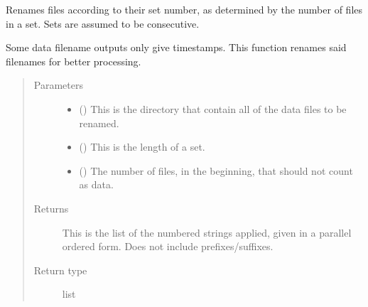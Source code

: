 \documentclass[letterpaper,10pt,english]{sphinxmanual}
\begin{document}

\begin{fulllineitems}
\label{\detokenize{python_docstrings/IfA_Smeargle.bravo.renaming:IfA_Smeargle.bravo.renaming.set_determinization_renaming}}
Renames files according to their set number, as determined by the
number of files in a set. Sets are assumed to be consecutive.

Some data filename outputs only give timestamps. This function renames
said filenames for better processing.
\begin{quote}\begin{description}
\item[{Parameters}] \leavevmode\begin{itemize}
\item {} 
 () \textendash{} This is the directory that contain all of the data files to be
renamed.

\item {} 
 () \textendash{} This is the length of a set.

\item {} 
 (\sphinxstyleliteralemphasis{\sphinxupquote{ (}}\sphinxstyleliteralemphasis{\sphinxupquote{)}}) \textendash{} The number of files, in the beginning, that should not count as data.

\end{itemize}

\item[{Returns}] \leavevmode
{} \textendash{} This is the list of the numbered strings applied, given in a parallel
ordered form. Does not include prefixes/suffixes.

\item[{Return type}] \leavevmode
list

\end{description}\end{quote}

\end{fulllineitems}
\end{document}
